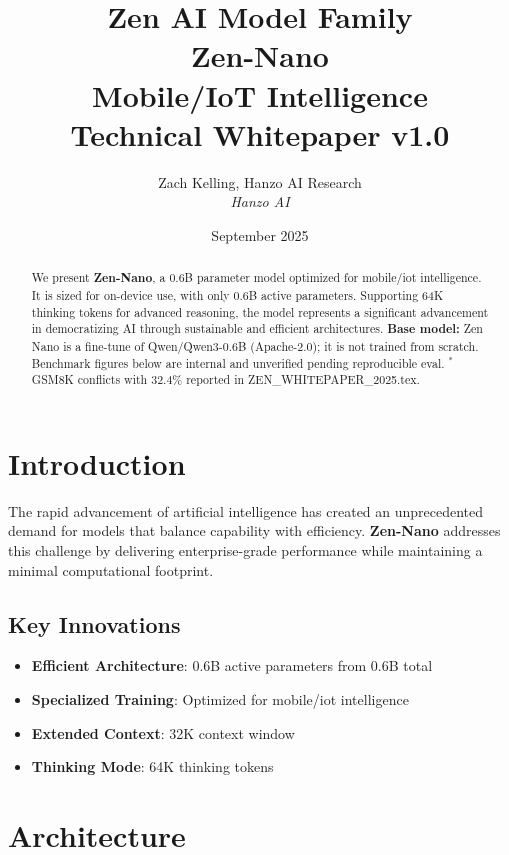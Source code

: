 \documentclass[11pt,a4paper]{article}
\title{
    \vspace{-2cm}
    \Large \textbf{Zen AI Model Family} \\
    \vspace{0.5cm}
    \Huge \textbf{Zen-Nano} \\
    \vspace{0.3cm}
    \large Mobile/IoT Intelligence \\
    \vspace{0.5cm}
    \normalsize Technical Whitepaper v1.0
}
\author{Zach Kelling, Hanzo AI Research\\
\textit{Hanzo AI}}
\date{September 2025}
\begin{document}
\maketitle

\begin{abstract}
We present \textbf{Zen-Nano}, a 0.6B parameter model optimized for mobile/iot intelligence. 
It is sized for on-device use, with only 0.6B active parameters. Supporting 64K thinking tokens for advanced reasoning, the model represents a significant advancement in democratizing AI through sustainable and efficient architectures.
\textbf{Base model:} Zen Nano is a fine-tune of Qwen/Qwen3-0.6B (Apache-2.0); it is not trained from scratch. Benchmark figures below are internal and unverified pending reproducible eval. $^{*}$GSM8K conflicts with 32.4\% reported in ZEN\_WHITEPAPER\_2025.tex.
\end{abstract}

\tableofcontents
\newpage

\section{Introduction}

The rapid advancement of artificial intelligence has created an unprecedented demand for models that balance capability with efficiency. 
\textbf{Zen-Nano} addresses this challenge by delivering enterprise-grade performance while maintaining a minimal computational footprint.

\subsection{Key Innovations}
\begin{itemize}
    \item \textbf{Efficient Architecture}: 0.6B active parameters from 0.6B total
    \item \textbf{Specialized Training}: Optimized for mobile/iot intelligence
    \item \textbf{Extended Context}: 32K context window
    \item \textbf{Thinking Mode}: 64K thinking tokens
\end{itemize}
    
    

\section{Architecture}
\end{document}
